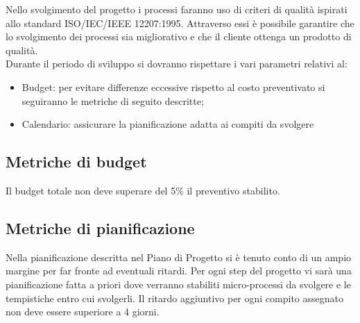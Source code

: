 \documentclass[../piano_di_qualifica.tex]{subfiles}
\begin{document}
Nello svolgimento del progetto i processi faranno uso di criteri di qualità ispirati allo standard ISO/IEC/IEEE 12207:1995. Attraverso essi è possibile garantire che lo svolgimento dei processi sia migliorativo e che il cliente ottenga un prodotto di qualità. \\
Durante il periodo di sviluppo si dovranno rispettare i vari parametri relativi al:
\begin{itemize}
\item Budget: per evitare differenze eccessive rispetto al costo preventivato si seguiranno le metriche di seguito descritte;
\item Calendario: assicurare la pianificazione adatta ai compiti da svolgere
\end{itemize}

\subsection{Metriche di budget}%
\label{sub:metr_bud}
Il budget totale non deve superare del 5\% il preventivo stabilito.

\subsection{Metriche di pianificazione} %
\label{sub: metr_pianif}
Nella pianificazione descritta nel Piano di Progetto si è tenuto conto di un ampio margine per far fronte ad eventuali ritardi. Per ogni step del progetto vi sarà una pianificazione fatta a priori dove verranno stabiliti micro-processi da svolgere e le tempistiche entro cui svolgerli. Il ritardo aggiuntivo per ogni compito assegnato non deve essere superiore a 4 giorni. 

\end{document}
